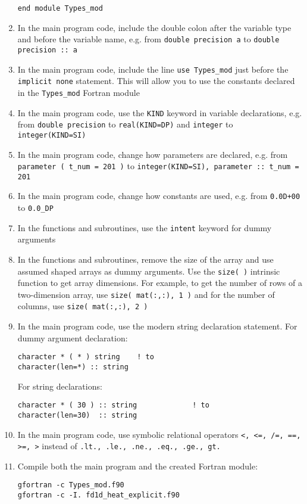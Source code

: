 \documentclass[12pt]{article}
\begin{document}
\begin{enumerate}
\begin{verbatim}
end module Types_mod
\end{verbatim}
\item In the main program code, include the double colon after the variable type and before 
the variable name, e.g. from \texttt{double precision a} to \texttt{double precision :: a}
\item In the main program code, include the line \texttt{use Types\_mod} just before
the \texttt{implicit none} statement. This will allow you to use the constants declared in the
\texttt{Types\_mod} Fortran module
\item In the main program code, use the \texttt{KIND} keyword in variable declarations, e.g.
from \texttt{double precision} to \texttt{real(KIND=DP)} and \texttt{integer} to 
\texttt{integer(KIND=SI)}
\item In the main program code, change how parameters are declared, e.g. from 
\texttt{parameter ( t\_num = 201 )} to \texttt{integer(KIND=SI), parameter :: t\_num = 201}
\item In the main program code, change how constants are used, e.g. from \texttt{0.0D+00} to 
\texttt{0.0\_DP}
\item In the functions and subroutines, use the \texttt{intent} keyword for dummy arguments
\item In the functions and subroutines, remove the size of the array and use assumed shaped
  arrays as dummy arguments. Use the \texttt{size( )} intrinsic function to get array 
dimensions. For example, to get the number of rows of a two-dimension array, use \texttt{size( mat(:,:), 1 )}
and for the number of columns, use \texttt{size( mat(:,:), 2 )}
\item In the main program code, use the modern string declaration statement. For dummy argument
declaration:
\begin{verbatim}
character * ( * ) string    ! to
character(len=*) :: string
\end{verbatim}
For string declarations:
\begin{verbatim}
character * ( 30 ) :: string             ! to
character(len=30)  :: string
\end{verbatim}
\item In the main program code, use symbolic relational operators \texttt{<, <=, /=, ==, >=, >}
instead of \texttt{.lt., .le., .ne., .eq., .ge., gt.}
\item Compile both the main program and the created Fortran module:
\begin{verbatim}
gfortran -c Types_mod.f90
gfortran -c -I. fd1d_heat_explicit.f90

\end{verbatim}
\end{enumerate}
\end{document}
